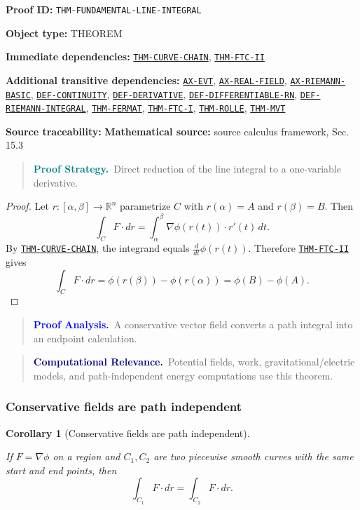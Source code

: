 \documentclass[10pt]{article}
\newcommand{\pidraw}[1]{\begingroup\urlstyle{tt}\nolinkurl{#1}\endgroup}
\newcommand{\pidref}[1]{\hyperref[prf:#1]{\pidraw{#1}}}
\newcommand{\pid}[1]{\pidref{#1}}
\newtheorem{corollary}[theorem]{Corollary}
\theoremstyle{definition}
\theoremstyle{remark}
\newenvironment{proofstrategy}
{\begin{quote}\small\noindent\textbf{\textcolor{teal}{Proof Strategy.}}\ }
{\end{quote}}
\newenvironment{proofanalysis}
{\begin{quote}\small\noindent\textbf{\textcolor{blue}{Proof Analysis.}}\ }
{\end{quote}}
\newenvironment{computationalrelevance}
{\begin{quote}\small\noindent\textbf{\textcolor{navy}{Computational Relevance.}}\ }
{\end{quote}}
\newcommand{\meta}[2]{\noindent\textbf{#1:} #2\par}
\begin{document}
\meta{Proof ID}{\pidraw{THM-FUNDAMENTAL-LINE-INTEGRAL}}
\meta{Object type}{THEOREM}
\meta{Immediate dependencies}{\pidref{THM-CURVE-CHAIN}, \pidref{THM-FTC-II}}
\meta{Additional transitive dependencies}{\pidref{AX-EVT}, \pidref{AX-REAL-FIELD}, \pidref{AX-RIEMANN-BASIC}, \pidref{DEF-CONTINUITY}, \pidref{DEF-DERIVATIVE}, \pidref{DEF-DIFFERENTIABLE-RN}, \pidref{DEF-RIEMANN-INTEGRAL}, \pidref{THM-FERMAT}, \pidref{THM-FTC-I}, \pidref{THM-ROLLE}, \pidref{THM-MVT}}
\meta{Source traceability}{\textbf{Mathematical source:} source calculus framework, Sec. 15.3}

\begin{proofstrategy}Direct reduction of the line integral to a one-variable derivative.\end{proofstrategy}

\begin{proof}

Let $r:[\alpha,\beta]\to\mathbb{R}^n$ parametrize $C$ with
$r(\alpha)=A$ and $r(\beta)=B$. Then
\[
\int_C F\cdot dr
=
\int_\alpha^\beta \nabla\phi(r(t))\cdot r'(t)\,dt.
\]
By \pid{THM-CURVE-CHAIN}, the integrand equals
$\frac{d}{dt}\phi(r(t))$. Therefore \pid{THM-FTC-II} gives
\[
\int_C F\cdot dr
=
\phi(r(\beta))-\phi(r(\alpha))
=
\phi(B)-\phi(A).
\]

\end{proof}

\begin{proofanalysis}A conservative vector field converts a path integral into an endpoint calculation.\end{proofanalysis}

\begin{computationalrelevance}Potential fields, work, gravitational/electric models, and path-independent energy computations use this theorem.\end{computationalrelevance}

\subsubsection{Conservative fields are path independent}

\begin{corollary}[Conservative fields are path independent]\label{prf:COR-PATH-INDEPENDENCE}

If $F=\nabla\phi$ on a region and $C_1,C_2$ are two piecewise smooth curves with the same start and end points, then
\[
\int_{C_1}F\cdot dr=\int_{C_2}F\cdot dr.
\]

\end{corollary}
\end{document}
